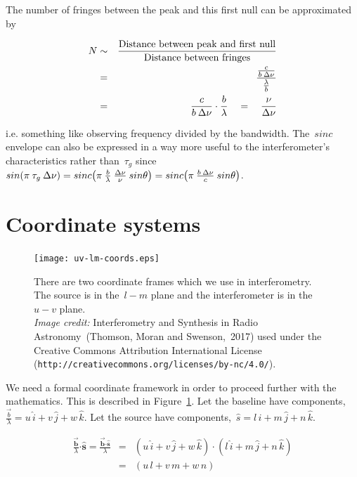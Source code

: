 \documentclass[11pt, a4paper]{article}
\newcommand{\msp}{\mkern \medmuskip}
\begin{document}
The number of fringes between the peak and this first null can be approximated by

\begin{eqnarray}
  \label{eq:31}
  N &\sim & \frac{\mbox{Distance between peak and first null}}{\mbox{Distance between fringes}} \nonumber \\
    &=&\frac{\frac{c}{b\msp \Delta \nu}}{\frac{\lambda }{b}} \nonumber \\
    &=& \frac{c}{b\msp \Delta \nu} \cdot \frac{b}{\lambda } \quad = \quad \frac{\nu }{\Delta \nu } \nonumber
\end{eqnarray}

i.e. something like observing frequency divided by the bandwidth. The~$sinc$ envelope can also be expressed in a way more useful to the interferometer's characteristics rather than~$\tau _g$ since~$sin(\pi \msp \tau _g \msp \Delta \nu ) = sinc \big (\pi \msp \frac{b}{\lambda } \msp \frac{\Delta \nu }{\nu } \msp sin\theta \big ) = sinc \big (\pi \msp \frac{b \msp \Delta \nu }{c} \msp sin\theta \big )$.

\section{Coordinate systems}

\begin{figure}
  \centering
    \texttt{[image: uv-lm-coords.eps]}
    \caption[]{There are two coordinate frames which we use in interferometry. The source is in the~$l-m$ plane and the interferometer is in the~$u-v$ plane.\\ \emph{Image credit:} Interferometry and Synthesis in Radio Astronomy~(Thomson, Moran and Swenson,~2017) used under the Creative Commons Attribution International License (\texttt{http://creativecommons.org/licenses/by-nc/4.0/}). }
    \label{fig:uv-lm-coords}
\end{figure}

We need a formal coordinate framework in order to proceed further with the mathematics. This is described in Figure~\ref{fig:uv-lm-coords}. Let the baseline have components,~$\frac{\vec{b}}{\lambda } = u\,\hat{i} + v\,\hat{j} + w\,\hat{k}$. Let the source have components,~$\hat{s} = l\,\hat{i} + m\,\hat{j} + n\,\hat{k}$.

\begin{eqnarray}
  \label{eq:18}
\frac{\vec{\mathbf{b}}}{\lambda }\boldsymbol{\cdot} \mathbf{\hat{s}} = \frac{\vec{\mathbf{b}} \boldsymbol{\cdot} \mathbf{\hat{s}}}{\lambda } &=& (u\,\hat{i} + v\,\hat{j} + w\,\hat{k}) \cdot (l\,\hat{i} + m\,\hat{j} + n\,\hat{k}) \nonumber \\
                                         &=& (u\,l + v\,m + w\,n) \nonumber
\end{eqnarray}
\end{document}
